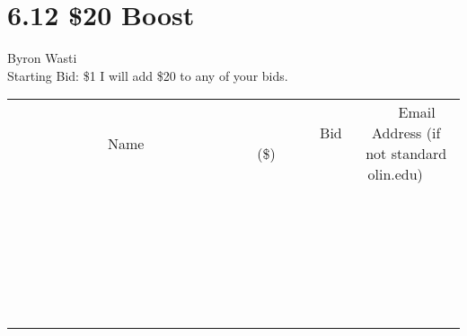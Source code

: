 \documentclass[11pt]{article}
\begin{document}
\section*{6.12 \$20 Boost}
Byron Wasti
\\
Starting Bid: \$1
\newline
I will add \$20 to any of your bids.
\\[6ex]
\begin{tabular}{c c c}
~~~~~~~~~~~~~Name~~~~~~~~~~~~~ & ~~~~~~~~~Bid (\$)~~~~~~~~~  & ~~~Email Address (if not standard olin.edu)~~~\\
 & & \\
\hline
 & & \\
\hline
 & & \\
\hline
 & & \\
\hline
 & & \\
\hline
 & & \\
\hline
 & & \\
\hline
 & & \\
\hline
 & & \\
\hline
 & & \\
\hline
 & & \\
\hline
 & & \\
\hline
 & & \\
\hline
 & & \\
\hline
 & & \\
\hline
 & & \\
\hline
 & & \\
\hline
 & & \\
\hline
 & & \\
\hline
 & & \\
\hline
 & & \\
\hline
 & & \\
\hline
 & & \\
\hline
 & & \\
\hline
 & & \\
\hline
 & & \\
\hline
\end{tabular}
\newpage
\end{document}
